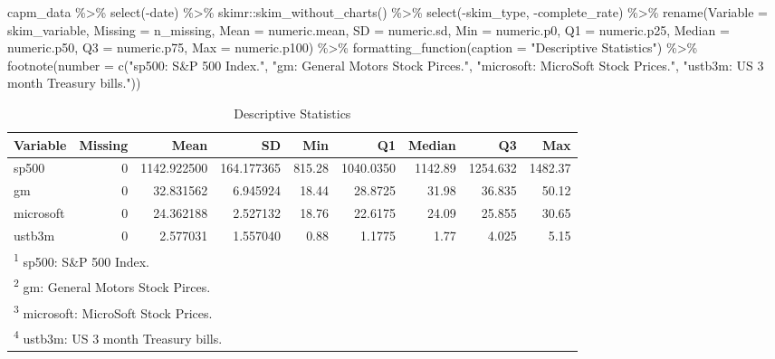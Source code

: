 \documentclass[
]{article}
\newenvironment{Shaded}{\begin{snugshade}}{\end{snugshade}}
\newcommand{\AttributeTok}[1]{\textcolor[rgb]{0.77,0.63,0.00}{#1}}
\newcommand{\FunctionTok}[1]{\textcolor[rgb]{0.00,0.00,0.00}{#1}}
\newcommand{\NormalTok}[1]{#1}
\newcommand{\SpecialCharTok}[1]{\textcolor[rgb]{0.00,0.00,0.00}{#1}}
\newcommand{\StringTok}[1]{\textcolor[rgb]{0.31,0.60,0.02}{#1}}
\begin{document}
\begin{Shaded}
\begin{Highlighting}[]
\NormalTok{capm\_data }\SpecialCharTok{\%\textgreater{}\%} 
    \FunctionTok{select}\NormalTok{(}\SpecialCharTok{{-}}\NormalTok{date) }\SpecialCharTok{\%\textgreater{}\%}\NormalTok{ skimr}\SpecialCharTok{::}\FunctionTok{skim\_without\_charts}\NormalTok{() }\SpecialCharTok{\%\textgreater{}\%}
    \FunctionTok{select}\NormalTok{(}\SpecialCharTok{{-}}\NormalTok{skim\_type, }\SpecialCharTok{{-}}\NormalTok{complete\_rate) }\SpecialCharTok{\%\textgreater{}\%} 
    \FunctionTok{rename}\NormalTok{(}\AttributeTok{Variable =}\NormalTok{ skim\_variable, }\AttributeTok{Missing =}\NormalTok{ n\_missing, }
           \AttributeTok{Mean =}\NormalTok{ numeric.mean, }\AttributeTok{SD =}\NormalTok{ numeric.sd, }\AttributeTok{Min =}\NormalTok{ numeric.p0, }
           \AttributeTok{Q1 =}\NormalTok{ numeric.p25, }\AttributeTok{Median =}\NormalTok{ numeric.p50, }
           \AttributeTok{Q3 =}\NormalTok{ numeric.p75, }\AttributeTok{Max =}\NormalTok{ numeric.p100) }\SpecialCharTok{\%\textgreater{}\%} 
    \FunctionTok{formatting\_function}\NormalTok{(}\AttributeTok{caption =} \StringTok{"Descriptive Statistics"}\NormalTok{) }\SpecialCharTok{\%\textgreater{}\%} 
    \FunctionTok{footnote}\NormalTok{(}\AttributeTok{number =} \FunctionTok{c}\NormalTok{(}\StringTok{"sp500: S\&P 500 Index."}\NormalTok{, }\StringTok{"gm: General Motors Stock Pirces."}\NormalTok{, }\StringTok{"microsoft: MicroSoft Stock Prices."}\NormalTok{, }\StringTok{"ustb3m: US 3 month Treasury bills."}\NormalTok{))}
\end{Highlighting}
\end{Shaded}

\begin{table}[!h]

\caption{\label{tab:unnamed-chunk-5}Descriptive Statistics}
\centering
\begin{tabular}[t]{lrrrrrrrr}
\toprule
Variable & Missing & Mean & SD & Min & Q1 & Median & Q3 & Max\\
\midrule
sp500 & 0 & 1142.922500 & 164.177365 & 815.28 & 1040.0350 & 1142.89 & 1254.632 & 1482.37\\
gm & 0 & 32.831562 & 6.945924 & 18.44 & 28.8725 & 31.98 & 36.835 & 50.12\\
microsoft & 0 & 24.362188 & 2.527132 & 18.76 & 22.6175 & 24.09 & 25.855 & 30.65\\
ustb3m & 0 & 2.577031 & 1.557040 & 0.88 & 1.1775 & 1.77 & 4.025 & 5.15\\
\bottomrule
\multicolumn{9}{l}{\rule{0pt}{1em}\textsuperscript{1} sp500: S\&P 500 Index.}\\
\multicolumn{9}{l}{\rule{0pt}{1em}\textsuperscript{2} gm: General Motors Stock Pirces.}\\
\multicolumn{9}{l}{\rule{0pt}{1em}\textsuperscript{3} microsoft: MicroSoft Stock Prices.}\\
\multicolumn{9}{l}{\rule{0pt}{1em}\textsuperscript{4} ustb3m: US 3 month Treasury bills.}\\
\end{tabular}
\end{table}
\end{document}
